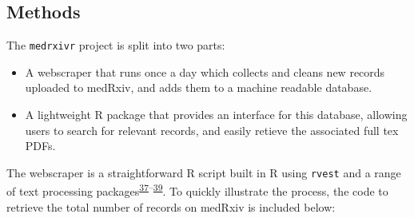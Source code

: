 \documentclass[a4paper, nobind]{templates/ociamthesis}
\providecommand{\tightlist}{%
  \setlength{\itemsep}{0pt}\setlength{\parskip}{0pt}}
\newenvironment{Shaded}{\begin{snugshade}}{\end{snugshade}}
\newcommand{\CommentTok}[1]{\textcolor[rgb]{0.56,0.35,0.01}{\textit{#1}}}
\newcommand{\KeywordTok}[1]{\textcolor[rgb]{0.13,0.29,0.53}{\textbf{#1}}}
\newcommand{\NormalTok}[1]{#1}
\newcommand{\OperatorTok}[1]{\textcolor[rgb]{0.81,0.36,0.00}{\textbf{#1}}}
\newcommand{\StringTok}[1]{\textcolor[rgb]{0.31,0.60,0.02}{#1}}
\renewenvironment{Shaded}
{
  \vspace{4pt}%
  \begin{snugshade}%
}{%
  \end{snugshade}%
  \vspace{4pt}%
}
\begin{document}
\hypertarget{methods-2}{%
\subsection{Methods}\label{methods-2}}

The \texttt{medrxivr} project is split into two parts:

\begin{itemize}
\tightlist
\item
  A webscraper that runs once a day which collects and cleans new records uploaded to medRxiv, and adds them to a machine readable database.
\item
  A lightweight R package that provides an interface for this database, allowing users to search for relevant records, and easily retieve the associated full tex PDFs.
\end{itemize}

The webscraper is a straightforward R script built in R using \texttt{rvest} and a range of text processing packages\textsuperscript{\protect\hyperlink{ref-wickham2019}{37}--\protect\hyperlink{ref-wickham2020}{39}}. To quickly illustrate the process, the code to retrieve the total number of records on medRxiv is included below:

\begin{Shaded}
\end{Shaded}
\end{document}
